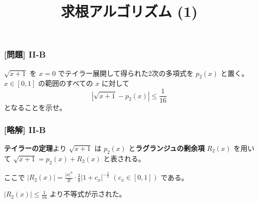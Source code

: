 \documentclass[dvipdfmx,aspectratio=169,20pt]{beamer}
\begin{document}
\graphicspath{{figs/}}

\begin{frame}
\frametitle{[問題] I\hspace{-.01em}I-B}
$\sqrt{x+1}$ を $x=0$ でテイラー展開して得られた2次の多項式を $p_2(x)$ と置く。
$x\in [0,1]$ の範囲のすべての $x$ に対して
\begin{equation*}
    |\sqrt{x+1} - p_2(x)|\le \frac{1}{16}
\end{equation*}
となることを示せ。
\end{frame}
\begin{frame}
\frametitle{[略解] I\hspace{-.01em}I-B}
{\bf テイラーの定理}より $\sqrt{x+1}$ は $p_2(x)$ と{\bf ラグランジュの剰余項} $R_2(x)$ を用いて $\sqrt{x+1} = p_2(x)+R_2(x)$ と表される。
\vspace{0.5cm}

ここで $|R_2(x)|=\frac{|x|^{3}}{3!}\cdot \frac{3}{8}|1+c_x|^{-\frac{5}{2}}$ $(c_x\in [0,1])$ である。
\vspace{0.5cm}

$|R_2(x)|\le \frac{1}{16}$ より不等式が示された。

\end{frame}

\title{求根アルゴリズム (1)}

\end{document}
